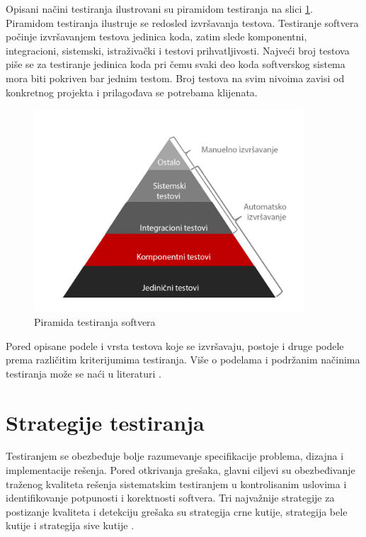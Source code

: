 \documentclass[12pt,oneside]{memoir}
\begin{document}
Opisani načini testiranja ilustrovani su piramidom testiranja na slici \ref{fig:piramida}. Piramidom testiranja ilustruje se redosled izvršavanja testova. Testiranje softvera počinje izvršavanjem testova jedinica koda, zatim slede komponentni, integracioni, sistemski, istraživački i testovi prihvatljivosti. Najveći broj testova piše se za testiranje jedinica koda pri čemu svaki deo koda softverskog sistema mora biti pokriven bar jednim testom. Broj testova na svim nivoima zavisi od konkretnog projekta i prilagođava se potrebama klijenata.
\begin{figure}[!ht]
  \centering
  \includegraphics[width=0.9\textwidth]{piramida.png}
  \caption{Piramida testiranja softvera}
  \label{fig:piramida}
\end{figure}


Pored opisane podele i vrsta testova koje se izvršavaju, postoje i druge podele prema različitim kriterijumima testiranja. Više o podelama i podržanim načinima testiranja može se naći u literaturi \cite{TestingProcess}.

\section{Strategije testiranja} \label{broj3}
Testiranjem se obezbeđuje bolje razumevanje specifikacije problema, dizajna i implementacije rešenja. Pored otkrivanja grešaka, glavni ciljevi su obezbeđivanje traženog kvaliteta rešenja sistematskim testiranjem u kontrolisanim uslovima i identifikovanje potpunosti i korektnosti softvera. Tri najvažnije strategije za postizanje kvaliteta i detekciju grešaka su 
strategija crne kutije, strategija bele kutije i strategija sive kutije \cite{Strategies}.
 
\end{document}
